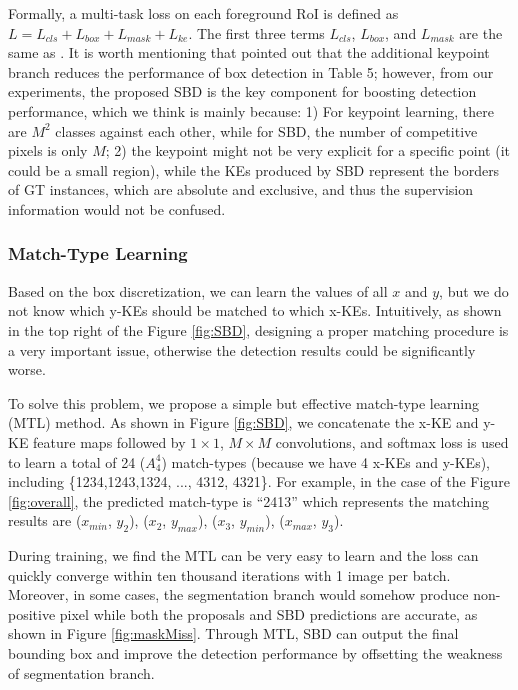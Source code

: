 \documentclass{article}
\begin{document}
Formally, a multi-task loss on each foreground RoI is defined as $L = L_{cls} + L_{box} + L_{mask} + L_{ke}$. The first three terms $L_{cls}$, $L_{box}$, and $L_{mask}$ are the same as \cite{he2017mask}. 
It is worth mentioning that \cite{he2017mask} pointed out that the additional keypoint branch reduces the performance of box detection in Table 5; however, from our experiments, the proposed SBD is the key component for boosting detection performance, which we think is mainly because: 1) For keypoint learning, there are $M^{2}$ classes against each other, while for SBD, the number of competitive pixels is only $M$; 2) the keypoint might not be very explicit for a specific point (it could be a small region), while the KEs produced by SBD represent the borders of GT instances, which are absolute and exclusive, and thus the supervision information would not be confused.

\subsubsection{Match-Type Learning}
Based on the box discretization, we can learn the values of all $x$ and $y$, but we do not know which y-KEs should be matched to which x-KEs. Intuitively, as shown in the top right of the Figure \ref{fig:SBD}, designing a proper matching procedure is a very important issue, otherwise the detection results could be significantly worse.

To solve this problem, we propose a simple but effective match-type learning (MTL) method. As shown in Figure \ref{fig:SBD}, we concatenate the x-KE and y-KE feature maps followed by $1\times 1$, $M\times M$ convolutions, and softmax loss is used to learn a total of 24 ($A_{4}^{4}$) match-types (because we have 4 x-KEs and y-KEs), including \{1234,1243,1324, ..., 4312, 4321\}. For example, in the case of the Figure \ref{fig:overall}, the predicted match-type is ``2413'' which represents the matching results are ($x_{min}$, $y_{2}$), ($x_{2}$, $y_{max}$), ($x_{3}$, $y_{min}$), ($x_{max}$, $y_{3}$). 

During training, we find the MTL can be very easy to learn and the loss can quickly converge within ten thousand iterations with 1 image per batch. Moreover, in some cases, the segmentation branch would somehow produce non-positive pixel while both the proposals and SBD predictions are accurate, as shown in Figure \ref{fig:maskMiss}. Through MTL, SBD can output the final bounding box and improve the detection performance by offsetting the weakness of segmentation branch. 
\end{document}
